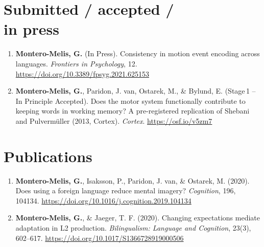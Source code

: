 \documentclass[margin, 11pt]{res} %
\begin{document}
\begin{resume}
\section{\sc Submitted / accepted /\\in press}



\begin{enumerate}

	\item \textbf{Montero-Melis, G.} (In Press). Consistency in motion event encoding across languages. \emph{Frontiers in Psychology}, 12. \url{https://doi.org/10.3389/fpsyg.2021.625153}


	\item \textbf{Montero-Melis, G.}, Paridon, J. van, Ostarek, M., \& Bylund, E. (Stage\,1 -- In Principle Accepted). Does the motor system functionally contribute to keeping words in working memory? A pre-registered replication of Shebani and Pulvermüller (2013, Cortex). \emph{Cortex}. \url{https://osf.io/v5zm7}

\end{enumerate}


\section{\sc Publications}



\begin{enumerate}

	\item \textbf{Montero-Melis, G.}, Isaksson, P., Paridon, J. van, \& Ostarek, M. (2020). Does using a foreign language reduce mental imagery? \emph{Cognition}, 196, 104134. \url{https://doi.org/10.1016/j.cognition.2019.104134}

	\item \textbf{Montero-Melis, G.}, \& Jaeger, T. F. (2020). Changing expectations mediate adaptation in L2 production. \emph{Bilingualism: Language and Cognition}, 23(3), 602–617. \url{https://doi.org/10.1017/S1366728919000506}


\end{enumerate}
\end{resume}
\end{document}
